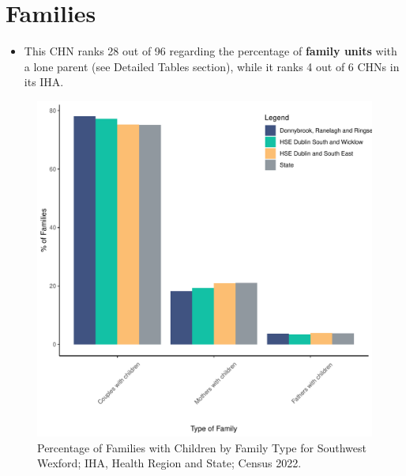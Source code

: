 \documentclass{article}
\begin{document}
\section{Families}\label{sect:Fam}
\begin{itemize}
\item This CHN ranks  28 out of 96 regarding the percentage of \textbf{family units} with a lone parent (see Detailed Tables section), while it ranks   4 out of 6 CHNs in its IHA.
\end{itemize}
\begin{figure}[H]
	\centering
	\includegraphics[width = 150mm]{../figures/FamED.pdf}
	\caption{Percentage of Families with Children by Family Type for Southwest Wexford; IHA, Health Region and State; Census 2022.}
	\label{fig:vbnv}
	\end{figure}
	
\end{document}
